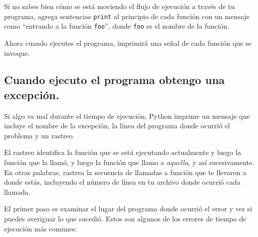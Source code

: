 \documentclass[10pt]{book}
\begin{document}
Si no sabes bien cómo se está moviendo el flujo de ejecución a través
de tu programa, agrega sentencias {\tt print} al principio de cada
función con un mensaje como ``entrando a la función {\tt foo}'', donde
{\tt foo} es el nombre de la función.

Ahora cuando ejecutes el programa, imprimirá una señal de cada
función que se invoque.


\subsection{Cuando ejecuto el programa obtengo una excepción.}

Si algo va mal durante el tiempo de ejecución, Python
imprime un mensaje que incluye el nombre de la
excepción, la línea del programa donde ocurrió el problema
y un rastreo.

El rastreo identifica la función que se está ejecutando actualmente y
luego la función que la llamó, y luego la función que llamo a
{\em aquella}, y así sucesivamente.  En otras palabras, rastrea la secuencia de
llamadas a función que te llevaron a donde estás, incluyendo el número
de línea en tu archivo donde ocurrió cada llamada.

El primer paso es examinar el lugar del programa donde
ocurrió el error y ver si puedes averiguar lo que sucedió.
Estos son algunos de los errores de tiempo de ejecución más comunes:
\end{document}
